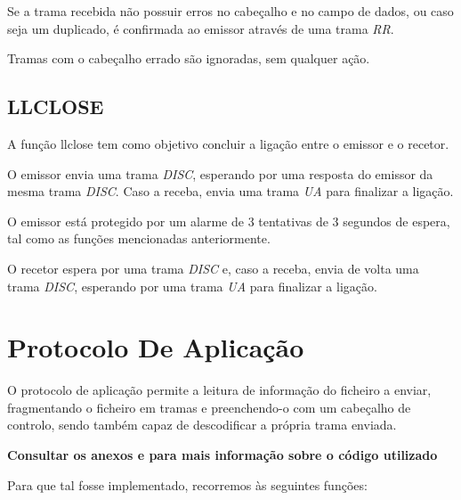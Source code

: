 \documentclass[11pt]{article}
\begin{document}
Se a trama recebida não possuir erros no cabeçalho e no campo de dados, ou caso seja um duplicado, é confirmada ao emissor através de uma trama \textit{RR}.

Tramas com o cabeçalho errado são ignoradas, sem qualquer ação.

\subsection{LLCLOSE}

A função llclose tem como objetivo concluir a ligação entre o emissor e o recetor.

O emissor envia uma trama \textit{DISC}, esperando por uma resposta do emissor da mesma trama \textit{DISC}. Caso a receba, envia uma trama \textit{UA} para finalizar a ligação.

O emissor está protegido por um alarme de 3 tentativas de 3 segundos de espera, tal como as funções mencionadas anteriormente.

O recetor espera por uma trama \textit{DISC} e, caso a receba, envia de volta uma trama \textit{DISC}, esperando por uma trama \textit{UA} para finalizar a ligação.


\section{Protocolo De Aplicação}

O protocolo de aplicação permite a leitura de informação do ficheiro a enviar, fragmentando o ficheiro em tramas e preenchendo-o com um cabeçalho de controlo, sendo também capaz de descodificar a própria trama enviada.

\textbf{Consultar os anexos  e  para mais informação sobre o código utilizado }

Para que tal fosse implementado, recorremos às seguintes funções:
\end{document}
